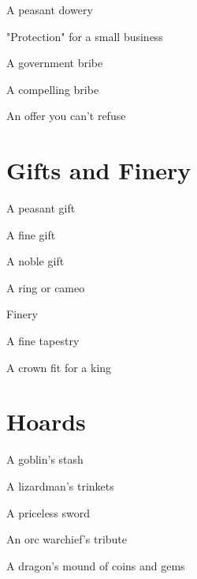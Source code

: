 A peasant dowery	 

       

"Protection" for a small business	 

       

A government bribe	 

       

A compelling bribe	 

       

An offer you can't refuse	 

       
\section{Gifts and Finery}    
       

A peasant gift	 

       

A fine gift	 

       

A noble gift	 

       

A ring or cameo	 

       

Finery	 

       

A fine tapestry	 

       

A crown fit for a king	 

       
\section{Hoards}   
       

A goblin's stash	 

       

A lizardman's trinkets	 

       

A priceless sword	 

       

An orc warchief's tribute	 

       

A dragon's mound of coins and gems	 

       
